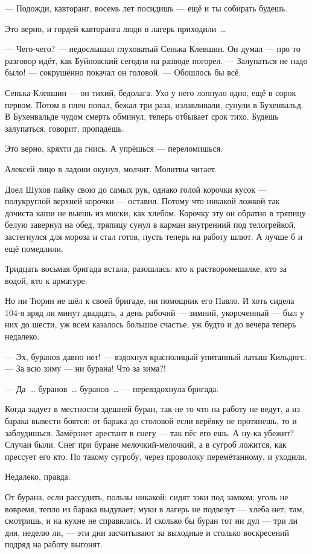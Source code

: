 --- Подожди, кавторанг, восемь лет посидишь --- ещё и ты собирать будешь.

Это верно, и гордей кавторанга люди в лагерь приходили~\dots{}

--- Чего-чего? --- недослышал глуховатый Сенька Клевшин. Он думал --- про то разговор идёт, как 
Буйновский сегодня на разводе погорел. --- Залупаться не надо было! --- сокрушённо покачал он 
головой. --- Обошлось бы всё.

Сенька Клевшин --- он тихий, бедолага. Ухо у него лопнуло одно, ещё в сорок первом. Потом в плен 
попал, бежал три раза, излавливали, сунули в Бухенвальд. В Бухенвальде чудом смерть обминул, 
теперь отбывает срок тихо. Будешь залупаться, говорит, пропадёшь.

Это верно, кряхти да гнись. А упрёшься --- переломишься.

Алексей лицо в ладони окунул, молчит. Молитвы читает.

Доел Шухов пайку свою до самых рук, однако голой корочки кусок --- полукруглой верхней 
корочки --- оставил. Потому что никакой ложкой так дочиста каши не выешь из миски, как хлебом. 
Корочку эту он обратно в тряпицу белую завернул на обед, тряпицу сунул в карман внутренний 
под телогрейкой, застегнулся для мороза и стал готов, пусть теперь на работу шлют. А лучше б и 
ещё помедлили.

Тридцать восьмая бригада встала, разошлась: кто к растворомешалке, кто за водой, кто к 
арматуре.

Но ни Тюрин не шёл к своей бригаде, ни помощник его Павло. И хоть сидела 104-я вряд ли минут 
двадцать, а день рабочий --- зимний, укороченный --- был у них до шести, уж всем казалось большое 
счастье, уж будто и до вечера теперь недалеко.

--- Эх, буранов давно нет! --- вздохнул краснолицый упитанный латыш Кильдигс. --- За всю зиму --- ни 
бурана! Что за зима?!

--- Да~\dots{} буранов~\dots{} буранов~\dots{} --- перевздохнула бригада.

Когда задует в местности здешней буран, так не то что на работу не ведут, а из барака вывести 
боятся: от барака до столовой если верёвку не протянешь, то и заблудишься. Замёрзнет 
арестант в снегу --- так пёс его ешь. А ну-ка убежит? Случаи были. Снег при буране 
мелочкий-мелочкий, а в сугроб ложится, как прессует его кто. По такому сугробу, через 
проволоку перемётанному, и уходили.

Недалеко, правда.

От бурана, если рассудить, пользы никакой: сидят зэки под замком; уголь не вовремя, тепло из 
барака выдувает; муки в лагерь не подвезут --- хлеба нет; там, смотришь, и на кухне не 
справились. И сколько бы буран тот ни дул --- три ли дня, неделю ли, --- эти дни засчитывают за 
выходные и столько воскресений подряд на работу выгонят.

